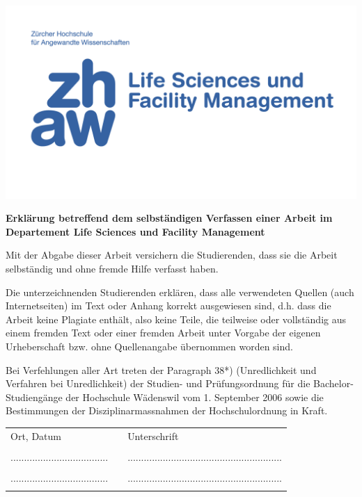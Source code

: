 
\includegraphics[scale=0.25]{Bilder/zhaw.png}
\vspace{2cm}

\textsf{\textbf{\huge{Erklärung betreffend dem selbständigen Verfassen einer Arbeit im Departement Life Sciences und Facility Management}}}
	
\vspace{1cm}
	
Mit der Abgabe dieser Arbeit versichern die Studierenden, dass sie die Arbeit selbständig und ohne fremde Hilfe verfasst haben.

Die unterzeichnenden Studierenden erklären, dass alle verwendeten Quellen (auch Internetseiten) im Text oder Anhang korrekt ausgewiesen sind, d.h. dass die Arbeit keine Plagiate enthält, also keine Teile, die teilweise oder vollständig aus einem fremden Text oder einer fremden Arbeit unter Vorgabe der eigenen Urheberschaft bzw. ohne Quellenangabe übernommen worden sind.

Bei Verfehlungen aller Art treten der Paragraph 38*) (Unredlichkeit und Verfahren bei Unredlichkeit) der Studien- und Prüfungsordnung für die Bachelor-Studiengänge der Hochschule Wädenswil vom 1. September 2006 sowie die Bestimmungen der Disziplinarmassnahmen der Hochschulordnung in Kraft. 


\vspace{2.5cm}

\begin{table}[H]

\begin{tabular}{p{3cm}p{5cm}p{3cm}}
	Ort, Datum &  & Unterschrift \\
	&&\\
....................................	&&.........................................................\\
	&&\\
	....................................	&&.........................................................\\
	&&\\
\end{tabular}	
\end{table}


